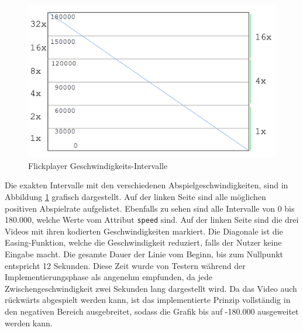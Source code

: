 \documentclass[11pt,a4paper]{report}
\begin{document}
\begin{figure}[h]
\begin{center}
\includegraphics[scale=0.4]{./images/29.png}
\caption{Flickplayer Geschwindigkeits-Intervalle}
\label{flickplayer_interval}
\end{center}
\end{figure}
Die exakten Intervalle mit den verschiedenen Abspielgeschwindigkeiten, sind in Abbildung \ref{flickplayer_interval} grafisch dargestellt. Auf der linken Seite sind alle möglichen positiven Abspielrate aufgelistet. Ebenfalls zu sehen sind alle Intervalle von 0 bis 180.000, welche Werte vom Attribut \texttt{speed} sind. Auf der linken Seite sind die drei Videos mit ihren kodierten Geschwindigkeiten markiert. Die Diagonale ist die Easing-Funktion, welche die Geschwindigkeit reduziert, falls der Nutzer keine Eingabe macht. Die gesamte Dauer der Linie vom Beginn, bis zum Nullpunkt entspricht 12 Sekunden. Diese Zeit wurde von Testern während der Implementierungsphase als angenehm empfunden, da jede Zwischengeschwindigkeit zwei Sekunden lang dargestellt wird.  Da das Video auch rückwärts abgespielt werden kann, ist das implementierte Prinzip vollständig in den negativen Bereich ausgebreitet, sodass die Grafik bis auf -180.000 ausgeweitet werden kann.
\end{document}
